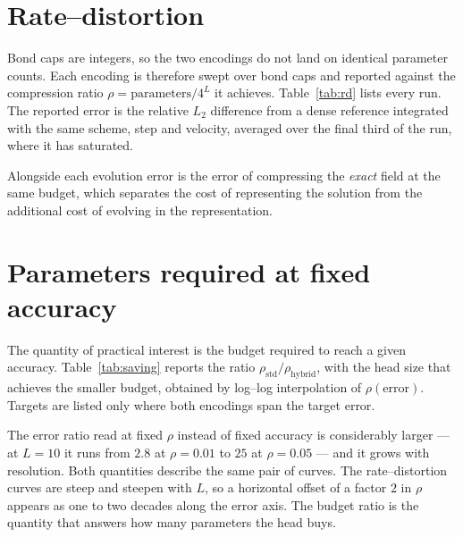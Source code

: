 \documentclass[aps,prfluids,reprint,onecolumn,amsmath,amssymb,nofootinbib,floatfix]{revtex4-2}
\begin{document}
\section{Rate--distortion}

Bond caps are integers, so the two encodings do not land on identical parameter
counts. Each encoding is therefore swept over bond caps and reported against the
compression ratio $\rho=\text{parameters}/4^L$ it achieves.
Table~\ref{tab:rd} lists every run. The reported error is the relative $L_2$
difference from a dense reference integrated with the same scheme, step and
velocity, averaged over the final third of the run, where it has saturated.

Alongside each evolution error is the error of compressing the \emph{exact}
field at the same budget, which separates the cost of representing the solution
from the additional cost of evolving in the representation.

\begin{table}[h]
\centering
\small
\TabRateDistortion
\caption{Every run. $N=0$ is the standard tensor train. ``head\,\%'' is the
share of the stored parameters occupied by the head.}
\label{tab:rd}
\end{table}

\section{Parameters required at fixed accuracy}

The quantity of practical interest is the budget required to reach a given
accuracy. Table~\ref{tab:saving} reports the ratio
$\rho_{\mathrm{std}}/\rho_{\mathrm{hybrid}}$, with the head size that achieves
the smaller budget, obtained by log--log interpolation of $\rho(\text{error})$.
Targets are listed only where both encodings span the target error.

\begin{table}[h]
\centering
\TabBudgetSaving
\caption{Parameters saved at fixed accuracy, and the head size achieving it.
The saving is $1.8$--$2.5$ and shows no trend with resolution over
$256^2$--$2048^2$.}
\label{tab:saving}
\end{table}

The error ratio read at fixed $\rho$ instead of fixed accuracy is considerably
larger --- at $L=10$ it runs from $2.8$ at $\rho=0.01$ to $25$ at $\rho=0.05$ ---
and it grows with resolution. Both quantities describe the same pair of curves.
The rate--distortion curves are steep and steepen with $L$, so a horizontal
offset of a factor $2$ in $\rho$ appears as one to two decades along the error
axis. The budget ratio is the quantity that answers how many parameters the head
buys.
\end{document}
